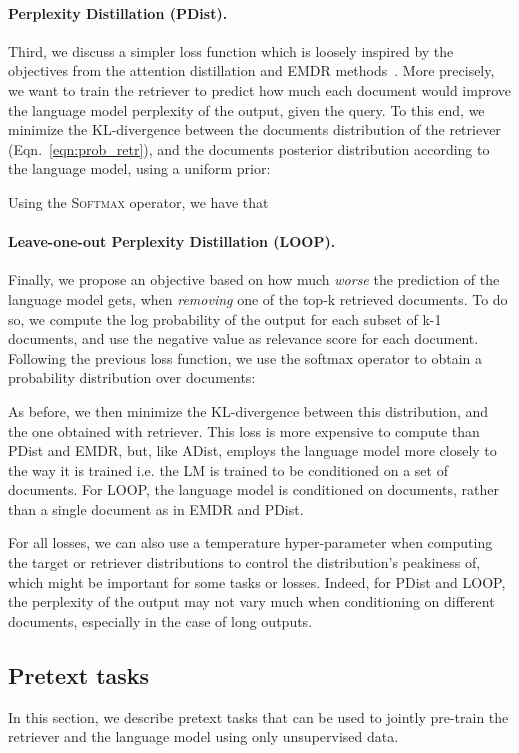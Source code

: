\documentclass[10pt]{article} \usepackage[preprint]{tmlr}
\begin{document}
\paragraph{Perplexity Distillation (PDist).}
Third, we discuss a simpler loss function which is loosely inspired by the objectives from the attention distillation and EMDR methods~\citep{izacard2021distilling,emdr}.
More precisely, we want to train the retriever to predict how much each document would improve the language model perplexity of the output, given the query.
To this end, we minimize the KL-divergence between the documents distribution of the retriever (Eqn.~\ref{eqn:prob_retr}), and the documents posterior distribution according to the language model, using a uniform prior:

Using the \textsc{Softmax} operator, we have that


\paragraph{Leave-one-out Perplexity Distillation (LOOP).}
Finally, we propose an objective based on how  much \emph{worse} the prediction of the language model gets, when \emph{removing} one of the top-k retrieved documents.
To do so, we compute the log probability of the output for each subset of k-1 documents, and use the negative value as relevance score for each document.
Following the previous loss function, we use the softmax operator to obtain a probability distribution over documents:

As before, we then minimize the KL-divergence between this distribution, and the one obtained with retriever.
This loss is more expensive to compute than PDist and EMDR, but, like ADist, employs the language model more closely to the way it is trained i.e. the LM is trained to be conditioned on a set of  documents. 
For LOOP, the language model is conditioned on  documents, rather than a single document as in EMDR and PDist. 

For all losses, we can also use a temperature hyper-parameter when computing the target or retriever distributions to control the distribution's peakiness of, which might be important for some tasks or losses. 
Indeed, for PDist and LOOP, the perplexity of the output may not vary much when conditioning on different documents, especially in the case of long outputs.

\subsection{Pretext tasks}
\label{section:pretext_tasks}
In this section, we describe pretext tasks that can be used to jointly pre-train the retriever and the language model using only unsupervised data.
\end{document}
